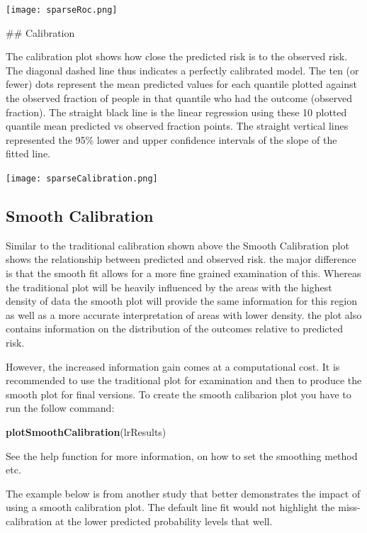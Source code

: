 \documentclass[
]{article}
\newenvironment{Shaded}{\begin{snugshade}}{\end{snugshade}}
\newcommand{\KeywordTok}[1]{\textcolor[rgb]{0.13,0.29,0.53}{\textbf{#1}}}
\newcommand{\NormalTok}[1]{#1}
\begin{document}
\texttt{[image: sparseRoc.png]}

\newpage \#\# Calibration

The calibration plot shows how close the predicted risk is to the
observed risk. The diagonal dashed line thus indicates a perfectly
calibrated model. The ten (or fewer) dots represent the mean predicted
values for each quantile plotted against the observed fraction of people
in that quantile who had the outcome (observed fraction). The straight
black line is the linear regression using these 10 plotted quantile mean
predicted vs observed fraction points. The straight vertical lines
represented the 95\% lower and upper confidence intervals of the slope
of the fitted line.

\texttt{[image: sparseCalibration.png]}

\newpage

\hypertarget{smooth-calibration}{%
\subsection{Smooth Calibration}\label{smooth-calibration}}

Similar to the traditional calibration shown above the Smooth
Calibration plot shows the relationship between predicted and observed
risk. the major difference is that the smooth fit allows for a more fine
grained examination of this. Whereas the traditional plot will be
heavily influenced by the areas with the highest density of data the
smooth plot will provide the same information for this region as well as
a more accurate interpretation of areas with lower density. the plot
also contains information on the distribution of the outcomes relative
to predicted risk.

However, the increased information gain comes at a computational cost.
It is recommended to use the traditional plot for examination and then
to produce the smooth plot for final versions. To create the smooth
calibarion plot you have to run the follow command:

\begin{Shaded}
\begin{Highlighting}[]
\KeywordTok{plotSmoothCalibration}\NormalTok{(lrResults)}
\end{Highlighting}
\end{Shaded}

See the help function for more information, on how to set the smoothing
method etc.

The example below is from another study that better demonstrates the
impact of using a smooth calibration plot. The default line fit would
not highlight the miss-calibration at the lower predicted probability
levels that well.
\end{document}
